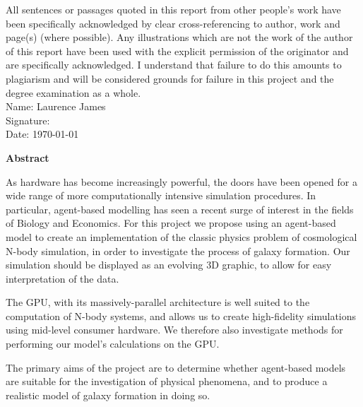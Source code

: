 \documentclass[11pt,a4paper]{article}
\begin{document}

\setcounter{tocdepth}{3} 



\newpage 
\noindent All sentences or passages quoted in this report from other people's work have been specifically acknowledged by clear cross-referencing to author, work and page(s) (where possible). Any illustrations which are not the work of the author of this report have been used with the explicit permission of the originator and are specifically acknowledged. I understand that failure to do this amounts to plagiarism and will be considered grounds for failure in this project and the degree examination as a whole. 
\\[0.3cm]
\large{Name: Laurence James}
\\[0.3cm]
\large{Signature:}
\\[0.3cm]
\large{Date: \today}

\newpage
\begin{center}
\bf{Abstract}
\end{center}
As hardware has become increasingly powerful, the doors have been opened for a wide range of more computationally intensive simulation procedures. In particular, agent-based modelling has seen a recent surge of interest in the fields of Biology and Economics. For this project we propose using an agent-based model to create an implementation of the classic physics problem of cosmological N-body simulation, in order to investigate the process of galaxy formation. Our simulation should be displayed as an evolving 3D graphic, to allow for easy interpretation of the data.

The GPU, with its massively-parallel architecture is well suited to the computation of N-body systems, and allows us to create high-fidelity simulations using mid-level consumer hardware. We therefore also investigate methods for performing our model's calculations on the GPU.

The primary aims of the project are to determine whether agent-based models are suitable for the investigation of physical phenomena, and to produce a realistic model of galaxy formation in doing so.
\newpage
\end{document}
